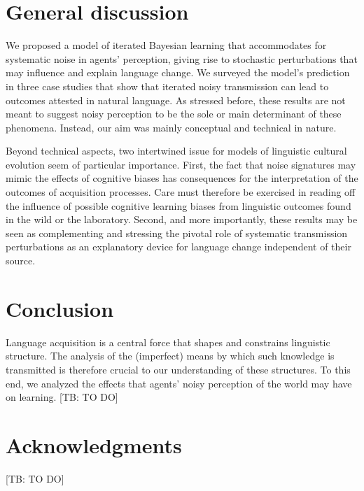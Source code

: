 \documentclass[10pt,a4paper]{article}
\newcommand{\tb}[1]{\textcolor[rgb]{.8,.33,.0}{[TB: #1]}}%
\begin{document}
\section{General discussion}
We proposed a model of iterated Bayesian learning that accommodates for systematic noise in agents' perception, giving rise to stochastic perturbations that may influence and explain language change. We surveyed the model's prediction in three case studies that show that iterated noisy transmission can lead to outcomes attested in natural language. As stressed before, these results are not meant to suggest noisy perception to be the sole or main determinant of these phenomena. Instead, our aim was mainly conceptual and technical in nature. 

Beyond technical aspects, two intertwined issue for models of linguistic cultural evolution seem of particular importance. First, the fact that noise signatures may mimic the effects of cognitive biases has consequences for the interpretation of the outcomes of acquisition processes. Care must therefore be exercised in reading off the influence of possible cognitive learning biases from linguistic outcomes found in the wild or the laboratory. Second, and more importantly, these results may be seen as complementing and stressing the pivotal role of systematic transmission perturbations as an explanatory device for language change independent of their source. 


\section{Conclusion}
Language acquisition is a central force that shapes and constrains linguistic structure. The analysis of the (imperfect) means by which such knowledge is transmitted is therefore crucial to our understanding of these structures. To this end, we analyzed the effects that agents' noisy perception of the world may have on learning. \tb{TO DO}


\section{Acknowledgments}
\tb{TO DO}




\setlength{\bibleftmargin}{.125in}
\setlength{\bibindent}{-\bibleftmargin}


\end{document}
